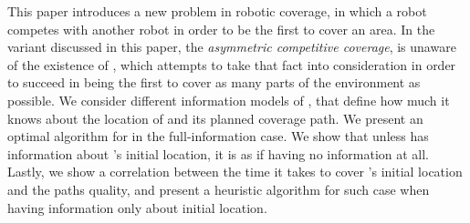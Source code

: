 This paper introduces a new problem in robotic coverage, in which a robot \rob competes with another robot \opp in order to be the first to cover an area. In the variant discussed in this paper, the {\em asymmetric competitive coverage}, \opp is unaware of the existence of \rob, which attempts to take that fact into consideration in order to succeed in being the first to cover as many parts of the environment as possible. We consider different information models of \rob, that define how much it knows about the location of \opp and its planned coverage path. We present an optimal algorithm for \rob in the full-information case. We show that unless \rob has information about \opp's initial location, it is as if having no information at all. Lastly, we show a correlation between the time it takes \rob to cover \opp's initial location and the paths quality, and present a heuristic algorithm for such case when having information only about initial location.